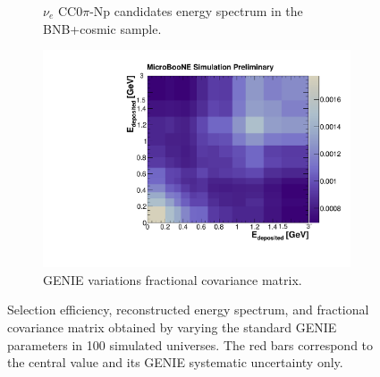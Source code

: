 \begin{figure}[htbp]
\begin{center}
\begin{subfigure}{0.45\textwidth}
      \caption{$\nu_{e}$ CC0$\pi$-Np candidates energy spectrum in the BNB+cosmic sample.}  \label{fig:reco_genie}
    \end{subfigure}
    \begin{subfigure}{0.45\textwidth}
      \includegraphics[width=\linewidth]{figures/frac_genie.pdf}
      \caption{GENIE variations fractional covariance matrix.}  \label{fig:frac_genie}
    \end{subfigure}
    	\caption{Selection efficiency, reconstructed energy spectrum, and fractional covariance matrix obtained by varying the standard GENIE parameters in 100 simulated universes. The red bars correspond to the central value and its GENIE systematic uncertainty only.} \label{fig:genie_sys}
	\end{center}
\end{figure}



